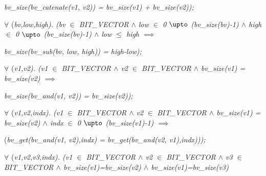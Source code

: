 \hspace*{1.00in}\it bv\_size\rm (\it bv\_catenate\rm (\it v1\rm , \it v2\rm )\rm ) \rm = \it bv\_size\rm (\it v1\rm ) \rm + \it bv\_size\rm (\it v2\rm )\rm )\rm ;

\vspace*{4mm}
\hspace*{0.20in} $\forall$  \rm (\it bv\rm ,\it low\rm ,\it high\rm )\rm . \rm (\it bv  $\in$  \it BIT\_VECTOR  $\land$  \it low  $\in$  \rm 0 $\upto$ \rm (\it bv\_size\rm (\it bv\rm )\rm -\rm 1\rm )  $\land$  \it high  $\in$  \rm 0 $\upto$ \rm (\it bv\_size\rm (\it bv\rm )\rm -\rm 1\rm )  $\land$  \it low  $\leq$  \it high  $\implies$ 

\hspace*{1.20in}\it bv\_size\rm (\it bv\_sub\rm (\it bv\rm , \it low\rm , \it high\rm )\rm ) \rm = \it high\rm -\it low\rm )\rm ;

\vspace*{4mm}
\hspace*{0.20in} $\forall$  \rm (\it v1\rm ,\it v2\rm )\rm . \rm (\it v1  $\in$  \it BIT\_VECTOR  $\land$  \it v2  $\in$  \it BIT\_VECTOR  $\land$  \it bv\_size\rm (\it v1\rm ) \rm = \it bv\_size\rm (\it v2\rm )  $\implies$ 

\hspace*{1.00in}\it bv\_size\rm (\it bv\_and\rm (\it v1\rm , \it v2\rm )\rm ) \rm = \it bv\_size\rm (\it v2\rm )\rm )\rm ;

\hspace*{0.35in}

\hspace*{0.20in} $\forall$  \rm (\it v1\rm ,\it v2\rm ,\it indx\rm )\rm . \rm (\it v1  $\in$  \it BIT\_VECTOR  $\land$  \it v2  $\in$  \it BIT\_VECTOR\hspace*{0.10in} $\land$  \it bv\_size\rm (\it v1\rm ) \rm = \it bv\_size\rm (\it v2\rm )  $\land$  \it indx $\in$  \rm 0 $\upto$ \rm (\it bv\_size\rm (\it v1\rm )\rm -\rm 1\rm ) $\implies$ 

\hspace*{1.20in}\rm (\it bv\_get\rm (\it bv\_and\rm (\it v1\rm , \it v2\rm )\rm ,\it indx\rm ) \rm = \it bv\_get\rm (\it bv\_and\rm (\it v2\rm , \it v1\rm )\rm ,\it indx\rm )\rm )\rm )\rm ;

\hspace*{0.35in}

\hspace*{0.20in} $\forall$  \rm (\it v1\rm ,\it v2\rm ,\it v3\rm ,\it indx\rm )\rm . \rm (\it v1 $\in$ \it BIT\_VECTOR  $\land$  \it v2 $\in$ \it BIT\_VECTOR  $\land$  \it v3 $\in$ \it BIT\_VECTOR  $\land$  \it bv\_size\rm (\it v1\rm )\rm =\it bv\_size\rm (\it v2\rm )  $\land$  \it bv\_size\rm (\it v1\rm )\rm =\it bv\_size\rm (\it v3\rm ) 

